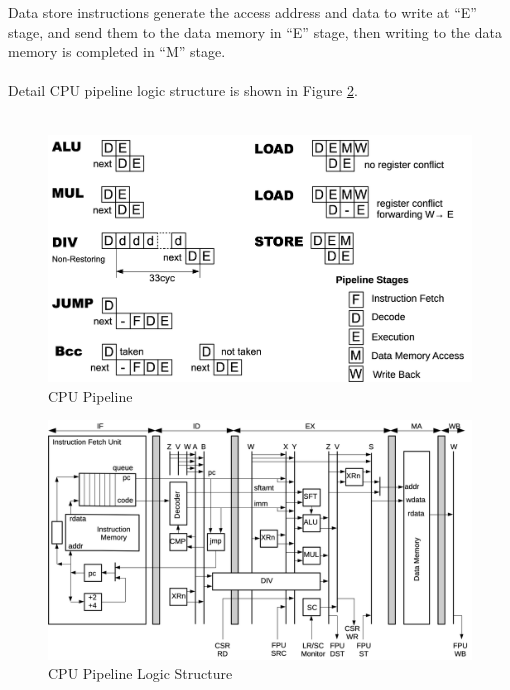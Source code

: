 Data store instructions generate the access address and data to write at “E” stage, and send them to the data memory in “E” stage, then writing to the data memory is completed in “M” stage.\\\\

Detail CPU pipeline logic structure is shown in Figure \ref{fig:CPUPipelineLogicStructure}.\\\\


\begin{figure}[H]
    \includegraphics[width=1.00\columnwidth]{./Figure/CPUPipeline.png}
    \caption{CPU Pipeline}
    \label{fig:CPUPipeline}
\end{figure}

\begin{figure}[H]
    \includegraphics[width=1.00\columnwidth]{./Figure/CPUPipelineLogicStructure.png}
    \caption{CPU Pipeline Logic Structure}
    \label{fig:CPUPipelineLogicStructure}
\end{figure}



